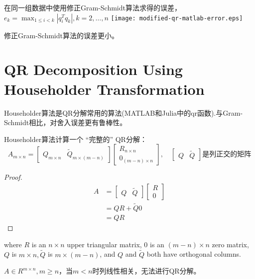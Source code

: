 \begin{example}
\begin{algorithm}[htbp]
{        }
    \end{algorithm}


    \begin{FigureCenter}{在同一组数据中使用修正Gram-Schmidt算法求得的误差，$e_{k}=\max _{1 \leq i<k}\left|q_{i}^{T} q_{k}\right|,  k=2, \ldots, n$}
        \texttt{[image: modified-qr-matlab-error.eps]}
    \end{FigureCenter}

    修正Gram-Schmidt算法的误差更小。
\end{example}

\section{QR Decomposition Using Householder Transformation}

Householder算法是QR分解常用的算法(MATLAB和Julia中的qr函数).与Gram-Schmidt相比，对舍入误差更有鲁棒性。

Householder算法计算一个 “完整的” QR分解：
$$ A_{m \times n}=\left[\begin{array}{ll}Q_{m \times n} & \tilde{Q}_{m \times (m-n)}\end{array}\right]\left[\begin{array}{l}R_{n  \times  n} \\ 0_{(m-n) \times n}\end{array}\right], \quad\left[\begin{array}{ll}Q & \tilde{Q}\end{array}\right]  是列正交的矩阵$$

\begin{proof}
    $$
    \begin{aligned}
        A&=\left[\begin{array}{ll}Q & \tilde{Q}\end{array}\right]\left[\begin{array}{l}R \\ 0\end{array}\right]\\
        &=QR + \tilde{Q} 0 \\ 
        & = QR
    \end{aligned}
    $$
\end{proof}

where $ R $ is an $ n \times n $ upper triangular matrix, $0$ is an $ (m-n) \times n $ zero matrix, $ Q  $ is $ m \times n,\tilde{Q} $ is $ m \times(m-n) $, and $ Q $ and $ \tilde{Q} $ both have orthogonal columns. 

\begin{remark}
    $A \in R^{m \times n}, m \ge n$，当$m < n$时列线性相关，无法进行QR分解。
\end{remark}



